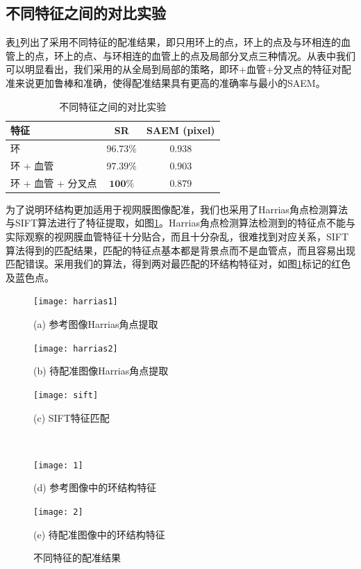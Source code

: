 \subsection{不同特征之间的对比实验}

表\ref{tab:features}列出了采用不同特征的配准结果，即只用环上的点，环上的点及与环相连的血管上的点，环上的点、与环相连的血管上的点及局部分叉点三种情况。从表中我们可以明显看出，我们采用的从全局到局部的策略，即环+血管+分叉点的特征对配准来说更加鲁棒和准确，使得配准结果具有更高的准确率与最小的SAEM。

\begin{table}[!ht]
\caption{不同特征之间的对比实验}
\centering
\begin{tabular}{p{3.6cm}cc}
\toprule
特征 & SR  & SAEM (pixel)\\
\midrule
环 & $96.73\%$ & $0.938$\\
环 + 血管  & $97.39\%$ & $0.903$\\
环 + 血管 + 分叉点 & $\mathbf{100\%}$ & $\mathbf{0.879}$ \\
\bottomrule
\end{tabular}
\label{tab:features}
\end{table}

为了说明环结构更加适用于视网膜图像配准，我们也采用了Harrias角点检测算法与SIFT算法进行了特征提取，如图\ref{fig:ComparisionFeature}。Harrias角点检测算法检测到的特征点不能与实际观察的视网膜血管特征十分贴合，而且十分杂乱，很难找到对应关系，SIFT算法得到的匹配结果，匹配的特征点基本都是背景点而不是血管点，而且容易出现匹配错误。采用我们的算法，得到两对最匹配的环结构特征对，如图\ref{fig:ComparisionFeature}标记的红色及蓝色点。

\begin{figure}[!ht]
\centering
\begin{minipage}[b]{0.48\textwidth} 
      \centering 
      \texttt{[image: harrias1]}
        \centerline{(a) 参考图像Harrias角点提取}\medskip
\end{minipage}
  \begin{minipage}[b]{0.48\textwidth}
    \centering
    \texttt{[image: harrias2]}
      \centerline{(b) 待配准图像Harrias角点提取}\medskip
  \end{minipage}
\begin{minipage}[b]{1\textwidth}
	\centering
      \texttt{[image: sift]}
        \centerline{(c) SIFT特征匹配}\medskip
    \end{minipage}
\\
  \begin{minipage}[b]{0.48\textwidth}
    \centering
    \texttt{[image: 1]}
      \centerline{(d) 参考图像中的环结构特征}\medskip
  \end{minipage}
 \begin{minipage}[b]{0.48\textwidth}
    \centering
      \texttt{[image: 2]}
        \centerline{(e) 待配准图像中的环结构特征}\medskip
    \end{minipage}
\caption{不同特征的配准结果}
\label{fig:ComparisionFeature}
\end{figure}


